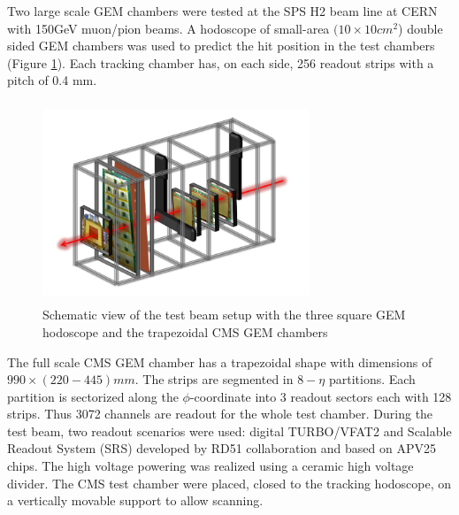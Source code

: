 Two large scale GEM chambers were tested at the SPS H2 beam line at CERN with 150GeV muon/pion beams. A hodoscope of small-area $(10\times 10 cm^2$) double sided GEM chambers was used to predict the hit position in the test chambers (Figure \ref{tbsetup}). Each tracking chamber has, on each side, 256 readout strips with a pitch of 0.4 mm.

\begin{figure}[htb]
	\begin{center}
		\includegraphics[width=8.0cm,height=6cm]{figures/GEM/tbsetup.png}
		\caption{Schematic view of the test beam setup with the three square GEM hodoscope and the trapezoidal CMS GEM chambers}
		\label{tbsetup}
	\end{center}
\end{figure} 

The full scale CMS GEM chamber has a trapezoidal shape with dimensions of $990\times (220-445)mm$. The strips are segmented in $8-\eta$ partitions. Each partition is sectorized along the $\phi$-coordinate into 3 readout sectors each with 128 strips. Thus 3072 channels are readout for the whole test chamber. During the test beam, two readout scenarios were used: digital TURBO/VFAT2 and Scalable Readout System (SRS) developed by RD51 collaboration and based on APV25 chips. The high voltage powering was realized using a ceramic high voltage divider. The CMS test chamber were placed, closed to the tracking hodoscope, on a vertically movable support to allow scanning. 


